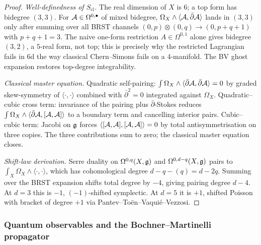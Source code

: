 \begin{proof}[Proof]
\emph{Well-definedness of $S_{\mathrm{cl}}$.} The real dimension of $X$
is $6$; a top form has bidegree $(3,3)$. For $\mathcal{A} \in \Omega^{0,\bullet}$
of mixed bidegree, $\Omega_X \wedge \langle \mathcal{A}, \bar\partial \mathcal{A}
\rangle$ lands in $(3,3)$ only after summing over all BRST channels
$(0,p) \otimes (0,q) \to (0,p+q+1)$ with $p+q+1 = 3$. The naive
one-form restriction $A \in \Omega^{0,1}$ alone gives bidegree
$(3, 2)$, a $5$-real form, not top; this is precisely why the
restricted Lagrangian fails in $6$d the way classical Chern--Simons
fails on a $4$-manifold. The BV ghost expansion restores top-degree
integrability.

\emph{Classical master equation.} Quadratic self-pairing:
$\int \Omega_X \wedge \langle \bar\partial\mathcal{A}, \bar\partial\mathcal{A}\rangle = 0$
by graded skew-symmetry of $\langle\cdot,\cdot\rangle$ combined with
$\bar\partial^2 = 0$ integrated against $\Omega_X$. Quadratic--cubic
cross term: invariance of the pairing plus $\bar\partial$-Stokes
reduces
$\int \Omega_X \wedge \langle \bar\partial\mathcal{A}, [\mathcal{A}, \mathcal{A}]\rangle$
to a boundary term and cancelling interior pairs. Cubic--cubic
term: Jacobi on $\mathfrak{g}$ forces
$\langle [\mathcal{A}, \mathcal{A}], [\mathcal{A}, \mathcal{A}]\rangle = 0$ by total antisymmetrisation
on three copies. The three contributions sum to zero; the classical
master equation closes.

\emph{Shift-law derivation.} Serre duality on $\Omega^{0,q}(X, \mathfrak{g})$
and $\Omega^{0,d-q}(X, \mathfrak{g})$ pairs to
$\int_X \Omega_X \wedge \langle \cdot, \cdot\rangle$, which has
cohomological degree $d - q - (q) = d - 2q$. Summing over the BRST
expansion shifts total degree by $-4$, giving pairing degree $d - 4$.
At $d = 3$ this is $-1$, $(-1)$-shifted symplectic. At $d = 5$ it is
$+1$, shifted Poisson with bracket of degree $+1$ via
Pantev--To\"en--Vaqui\'e--Vezzosi.
\qedhere
\end{proof}

\subsubsection{Quantum observables and the Bochner--Martinelli
propagator}

